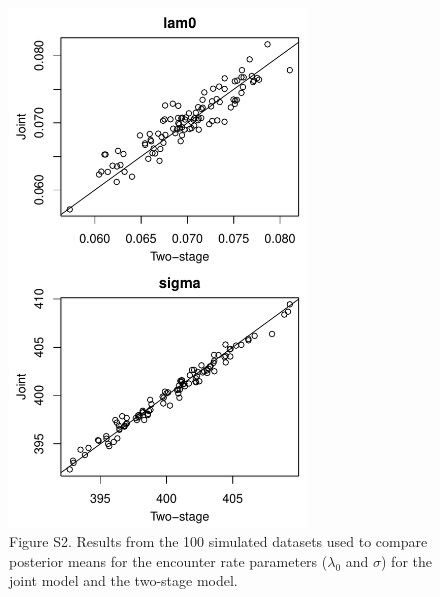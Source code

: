 \documentclass[12pt]{article}
\begin{document}
\begin{figure}[h!]
  \centering
  \includegraphics[width=0.7\textwidth]{sim/sim-lam0sig}
  \caption{Figure S2. Results from the 100 simulated datasets used to
    compare posterior means for the encounter rate parameters
    ($\lambda_0$ and $\sigma$) for the joint model and the two-stage
    model. }   
  \label{fig:sim-lam0sig}
\end{figure}


\clearpage
\end{document}
